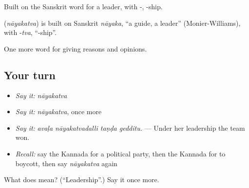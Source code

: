 Built on the Sanskrit word for a leader, with -, -ship.

\begin{cousinweb}
\textbf{} (\emph{nāyakatva}) is built on Sanskrit \emph{nāyaka}, \textquotedblleft{}a guide, a leader\textquotedblright{} (Monier-Williams), with -\emph{tva}, \textquotedblleft{}-ship\textquotedblright{}.
\end{cousinweb}

\begin{grammarlens}[title={What you've built}]
One more word for giving reasons and opinions.
\end{grammarlens}

\subsection*{Your turn}
\begin{itemize}
\raggedright
  \item \emph{Say it:} \emph{nāyakatva}
  \item \emph{Say it:} \emph{nāyakatva}, once more
  \item \emph{Say it:} \emph{avaḷa nāyakatvadalli taṇḍa gedditu.} — Under her leadership the team won.
  \item \emph{Recall:} say the Kannada for a political party, then the Kannada for to boycott, then say \emph{nāyakatva} again
\end{itemize}

\begin{tcolorbox}[breakable,colback=teal!4,colframe=teal!35!black,title={Before you move on}]
What does  mean? (\textquotedblleft{}Leadership\textquotedblright{}.) Say it once more.
\end{tcolorbox}
